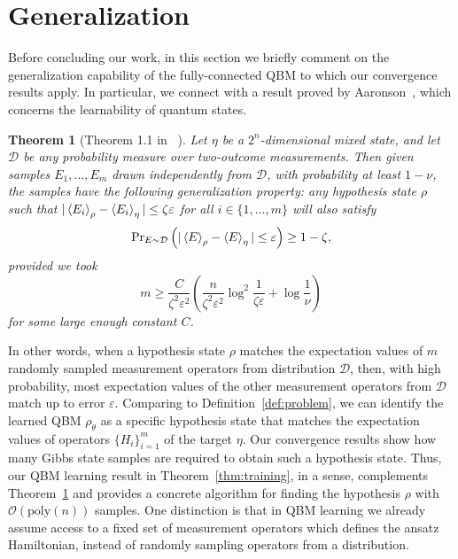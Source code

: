 \documentclass[
    aps,
    prx,
    onecolumn
]{revtex4-2}
\newtheorem{theorem}{Theorem}
\begin{document}
\section*{Generalization}
Before concluding our work, in this section we briefly comment on the generalization capability of the fully-connected QBM to which our convergence results apply. In particular, we connect with a result proved by Aaronson~\cite{Aaronson_2007}, which concerns the learnability of quantum states.

\begin{theorem}[Theorem 1.1 in ~\cite{Aaronson_2007}]
\label{thm:occams}
Let $\eta$ be a $2^n$-dimensional mixed state, and let $\mathcal{D}$ be any probability measure over two-outcome measurements. Then given samples
$E_1, \dots , E_m$ drawn independently from $\mathcal{D}$, with probability at least $1 - \nu$, the samples have the following generalization property: any hypothesis state $\rho$ such that $| \expval{E_i}_\rho - \expval{E_i}_\eta | \leq \zeta\varepsilon$ for all $i \in \{1, \dots, m\}$ will also satisfy
\begin{equation}
        \mathrm{Pr}_{E\sim \mathcal{D}} \left( |\expval{E}_\rho - \expval{E}_\eta |\leq \varepsilon\right) \geq 1 - \zeta,
\end{equation}
provided we took
\begin{equation}
\label{eq:m_ops}
    m\geq \frac{C}{\zeta^2 \varepsilon^2}\left(\frac{n}{\zeta^2 \varepsilon^2}\log^2 \frac{1}{\zeta\varepsilon} + \log \frac{1}{\nu} \right)
\end{equation}
for some large enough constant $C$. 
\end{theorem}

In other words, when a hypothesis state $\rho$ matches the expectation values of $m$ randomly sampled measurement operators from distribution $\mathcal{D}$, then, with high probability, most expectation values of the other measurement operators from $\mathcal{D}$ match up to error $\varepsilon$. Comparing to Definition~\ref{def:problem}, we can identify the learned QBM $\rho_\theta$ as a specific hypothesis state that matches the expectation values of operators $\{H_i\}_{i=1}^m$ of the target $\eta$. Our convergence results show how many Gibbs state samples are required to obtain such a hypothesis state. Thus, our QBM learning result in Theorem~\ref{thm:training}, in a sense, complements Theorem~\ref{thm:occams} and provides a concrete algorithm for finding the hypothesis $\rho$ with $\mathcal{O}(\mathrm{poly}(n))$ samples. One distinction is that in QBM learning we already assume access to a fixed set of measurement operators which defines the ansatz Hamiltonian, instead of randomly sampling operators from a distribution. 
\end{document}
